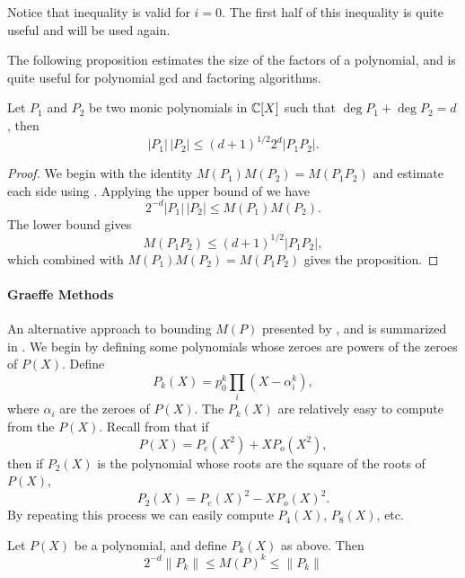 Notice that inequality  is valid for $i = 0$.
The first half of this inequality is quite useful and will be used
again.

\medskip
The following proposition estimates the size of the factors of a
polynomial, and is quite useful for polynomial {\sc gcd} and factoring
algorithms.

\begin{proposition} [{\Gelfond}] \label{Factor:CBound:Prop}
Let $P_{1}$ and $P_{2}$ be two monic polynomials in $\mathbb{C}[X]$ such that
$\deg P_1 + \deg P_2 = d$, then
\[
\left|P_{1}\right|\, \left| P_{2}\right| 
  \le (d+1)^{1/2}2^{d}\left| P_{1} P_{2} \right|.
\]
\end{proposition}

\begin{proof}
We begin with the identity $M(P_{1}) M(P_{2}) = M(P_{1} P_{2})$ and
estimate each side using .  Applying the upper
bound of  we have
\[
2^{-d}\left|P_{1}\right| \,\left|P_{2}\right| \le M(P_{1})M(P_{2}).
\]
The lower bound gives
\[
M(P_{1} P_{2}) \le (d+1)^{1/2} \left| P_{1} P_{2}\right|,
\]
which combined with $M(P_{1}) M(P_{2}) = M(P_{1} P_{2})$ gives the
proposition.
\end{proof}

\paragraph{Graeffe Methods}

An alternative approach to bounding $M(P)$ presented by {\Cerlienco},
{\Mignotte} and {\Piras} \cite{Cerlienco1987-vl} is summarized in
.  We begin by defining some
polynomials whose zeroes are powers of the zeroes of $P(X)$.  Define
\[
P_k(X) = p_0^k \prod_i \left(X - \alpha_i^k\right),
\]
where $\alpha_i$ are the zeroes of $P(X)$.  The $P_k(X)$ are
relatively easy to compute from the $P(X)$.  Recall from
 that if
\[
P(X) = P_e(X^2) + X P_o(X^2),
\]
then if $P_2(X)$ is the polynomial whose roots are the square of the
roots of $P(X)$,
\[
P_2(X) = P_e(X)^2 - X P_o(X)^2.
\]
By repeating this process we can easily compute $P_4(X)$, $P_8(X)$, etc.  

\begin{proposition}  
\label{Graeffe:Bound:Prop}
Let $P(X)$ be a polynomial, and define
$P_k(X)$ as above.  Then
\[
2^{-d} \|P_k\| \le M(P)^k \le \|P_k\|
\]
\end{proposition}

